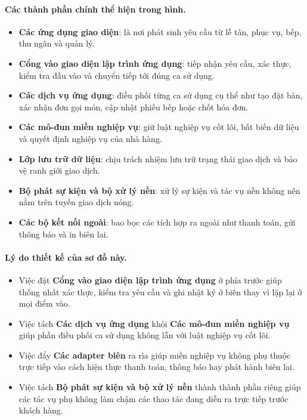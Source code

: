 \documentclass[11pt,a4paper]{article}
\begin{document}
\paragraph{Các thành phần chính thể hiện trong hình.}
\begin{itemize}
  \item \textbf{Các ứng dụng giao diện}: là nơi phát sinh yêu cầu từ lễ tân, phục vụ, bếp, thu ngân và quản lý.
  \item \textbf{Cổng vào giao diện lập trình ứng dụng}: tiếp nhận yêu cầu, xác thực, kiểm tra đầu vào và chuyển tiếp tới đúng ca sử dụng.
  \item \textbf{Các dịch vụ ứng dụng}: điều phối từng ca sử dụng cụ thể như tạo đặt bàn, xác nhận đơn gọi món, cập nhật phiếu bếp hoặc chốt hóa đơn.
  \item \textbf{Các mô-đun miền nghiệp vụ}: giữ luật nghiệp vụ cốt lõi, bất biến dữ liệu và quyết định nghiệp vụ của nhà hàng.
  \item \textbf{Lớp lưu trữ dữ liệu}: chịu trách nhiệm lưu trữ trạng thái giao dịch và bảo vệ ranh giới giao dịch.
  \item \textbf{Bộ phát sự kiện và bộ xử lý nền}: xử lý sự kiện và tác vụ nền không nên nằm trên tuyến giao dịch nóng.
  \item \textbf{Các bộ kết nối ngoài}: bao bọc các tích hợp ra ngoài như thanh toán, gửi thông báo và in biên lai.
\end{itemize}

\paragraph{Lý do thiết kế của sơ đồ này.}
\begin{itemize}
  \item Việc đặt \textbf{Cổng vào giao diện lập trình ứng dụng} ở phía trước giúp thống nhất xác thực, kiểm tra yêu cầu và ghi nhật ký ở biên thay vì lặp lại ở mọi điểm vào.
  \item Việc tách \textbf{Các dịch vụ ứng dụng} khỏi \textbf{Các mô-đun miền nghiệp vụ} giúp phần điều phối ca sử dụng không lẫn với luật nghiệp vụ cốt lõi.
  \item Việc đẩy \textbf{Các adapter biên} ra rìa giúp miền nghiệp vụ không phụ thuộc trực tiếp vào cách hiện thực thanh toán, thông báo hay phát hành biên lai.
  \item Việc tách \textbf{Bộ phát sự kiện và bộ xử lý nền} thành thành phần riêng giúp các tác vụ phụ không làm chậm các thao tác đang diễn ra trực tiếp trước khách hàng.
\end{itemize}
\end{document}
